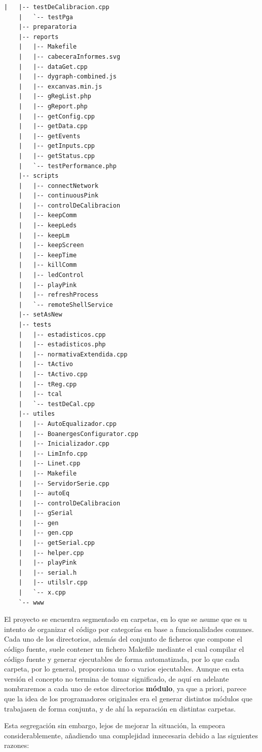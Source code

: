\begin{lstlisting}[label={lst:lm7-www-treeview}, caption={Estructura de directorios y ficheros de la interfaz web}]
    |   |-- testDeCalibracion.cpp
    |   `-- testPga
    |-- preparatoria
    |-- reports
    |   |-- Makefile
    |   |-- cabeceraInformes.svg
    |   |-- dataGet.cpp
    |   |-- dygraph-combined.js
    |   |-- excanvas.min.js
    |   |-- gRegList.php
    |   |-- gReport.php
    |   |-- getConfig.cpp
    |   |-- getData.cpp
    |   |-- getEvents
    |   |-- getInputs.cpp
    |   |-- getStatus.cpp
    |   `-- testPerformance.php
    |-- scripts
    |   |-- connectNetwork
    |   |-- continuousPink
    |   |-- controlDeCalibracion
    |   |-- keepComm
    |   |-- keepLeds
    |   |-- keepLm
    |   |-- keepScreen
    |   |-- keepTime
    |   |-- killComm
    |   |-- ledControl
    |   |-- playPink
    |   |-- refreshProcess
    |   `-- remoteShellService
    |-- setAsNew
    |-- tests
    |   |-- estadisticos.cpp
    |   |-- estadisticos.php
    |   |-- normativaExtendida.cpp
    |   |-- tActivo
    |   |-- tActivo.cpp
    |   |-- tReg.cpp
    |   |-- tcal
    |   `-- testDeCal.cpp
    |-- utiles
    |   |-- AutoEqualizador.cpp
    |   |-- BoanergesConfigurator.cpp
    |   |-- Inicializador.cpp
    |   |-- LimInfo.cpp
    |   |-- Linet.cpp
    |   |-- Makefile
    |   |-- ServidorSerie.cpp
    |   |-- autoEq
    |   |-- controlDeCalibracion
    |   |-- gSerial
    |   |-- gen
    |   |-- gen.cpp
    |   |-- getSerial.cpp
    |   |-- helper.cpp
    |   |-- playPink
    |   |-- serial.h
    |   |-- utilslr.cpp
    |   `-- x.cpp
    `-- www
\end{lstlisting}

El proyecto se encuentra segmentado en carpetas, en lo que se asume que es u intento de organizar el código por categorías en base a funcionalidades comunes. Cada uno de los directorios, además del conjunto de ficheros que compone el código fuente, suele contener un fichero Makefile mediante el cual compilar el código fuente y generar ejecutables de forma automatizada, por lo que cada carpeta, por lo general, proporciona uno o varios ejecutables. Aunque en esta versión el concepto no termina de tomar significado, de aquí en adelante nombraremos a cada uno de estos directorios \textbf{módulo}, ya que a priori, parece que la idea de los programadores originales era el generar distintos módulos que trabajasen de forma conjunta, y de ahí la separación en distintas carpetas.

Esta segregación sin embargo, lejos de mejorar la situación, la empeora considerablemente, añadiendo una complejidad innecesaria debido a las siguientes razones:

